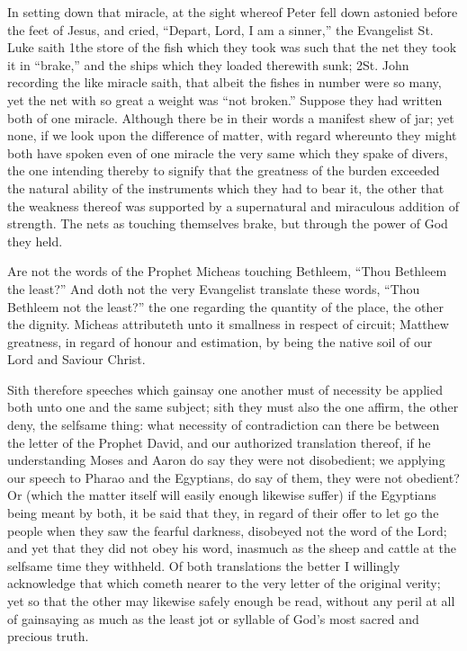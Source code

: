 In setting down that miracle, at the sight whereof Peter fell down astonied before the feet of Jesus, and cried, “Depart, Lord, I am a sinner,” the Evangelist St. Luke saith 1the store of the fish which they took was such that the net they took it in “brake,” and the ships which they loaded therewith sunk; 2St. John recording the like miracle saith, that albeit the fishes in number were so many, yet the net with so great a weight was “not broken.” Suppose they had written both of one miracle. Although there be in their words a manifest shew of jar; yet none, if we look upon the difference of matter, with regard whereunto they might both have spoken even of one miracle the very same which they spake of divers, the one intending thereby to signify that the greatness of the burden exceeded the natural ability of the instruments which they had to bear it, the other that the weakness thereof was supported by a supernatural and miraculous addition of strength. The nets as touching themselves brake, but through the power of God they held.

Are not the words of the Prophet Micheas touching Bethleem, “Thou Bethleem the least?” And doth not the very Evangelist translate these words, “Thou Bethleem not the least?” the one regarding the quantity of the place, the other the dignity. Micheas attributeth unto it smallness in respect of circuit; Matthew greatness, in regard of honour  and estimation, by being the native soil of our Lord and Saviour Christ.

Sith therefore speeches which gainsay one another must of necessity be applied both unto one and the same subject; sith they must also the one affirm, the other deny, the selfsame thing: what necessity of contradiction can there be between the letter of the Prophet David, and our authorized translation thereof, if he understanding Moses and Aaron do say they were not disobedient; we applying our speech to Pharao and the Egyptians, do say of them, they were not obedient? Or (which the matter itself will easily enough likewise suffer) if the Egyptians being meant by both, it be said that they, in regard of their offer to let go the people when they saw the fearful darkness, disobeyed not the word of the Lord; and yet that they did not obey his word, inasmuch as the sheep and cattle at the selfsame time they withheld. Of both translations the better I willingly acknowledge that which cometh nearer to the very letter of the original verity; yet so that the other may likewise safely enough be read, without any peril at all of gainsaying as much as the least jot or syllable of God’s most sacred and precious truth.

